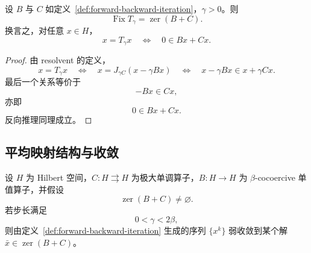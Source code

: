 \begin{proposition}[前向--后向固定点表述]\label{prop:forward-backward-fixed-point}
设 $B$ 与 $C$ 如定义~\ref{def:forward-backward-iteration}，$\gamma>0$。则
\[
\operatorname{Fix}T_\gamma=\operatorname{zer}(B+C).
\]
换言之，对任意 $x\in H$，
\[
x=T_\gamma x
\quad\Longleftrightarrow\quad
0\in Bx+Cx.
\]
\end{proposition}

\begin{proof}
由 resolvent 的定义，
\[
x=T_\gamma x
\quad\Longleftrightarrow\quad
x=J_{\gamma C}(x-\gamma Bx)
\quad\Longleftrightarrow\quad
x-\gamma Bx\in x+\gamma Cx.
\]
最后一个关系等价于
\[
-Bx\in Cx,
\]
亦即
\[
0\in Bx+Cx.
\]
反向推理同理成立。
\end{proof}

\subsection{平均映射结构与收敛}

\begin{theorem}[前向--后向分裂的收敛定理]\label{thm:forward-backward-convergence}
设 $H$ 为 Hilbert 空间，$C\colon H\rightrightarrows H$ 为极大单调算子，$B\colon H\to H$ 为 $\beta$-cocoercive 单值算子，并假设
\[
\operatorname{zer}(B+C)\neq \varnothing.
\]
若步长满足
\[
0<\gamma<2\beta,
\]
则由定义~\ref{def:forward-backward-iteration} 生成的序列 $\{x^k\}$ 弱收敛到某个解 $\bar x\in \operatorname{zer}(B+C)$。
\end{theorem}

